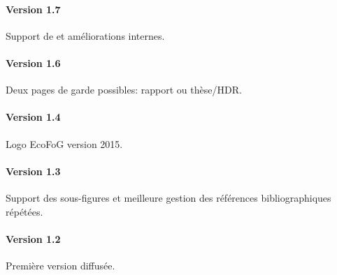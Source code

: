 \documentclass[
  a4paper, %
  11pt, extrafontsizes, %
  onecolumn, %
  openright, %
]{memoir}
\begin{document}
\paragraph{Version 1.7}
Support de  et améliorations internes.

\paragraph{Version 1.6}
Deux pages de garde possibles: rapport ou thèse/HDR.

\paragraph{Version 1.4}
Logo EcoFoG version 2015.

\paragraph{Version 1.3}
Support des sous-figures et meilleure gestion des références bibliographiques répétées.

\paragraph{Version 1.2}
Première version diffusée.

\backmatter
\clearpage


\SmallMargins


\printbibliography

\evenpage
 
\end{document}
